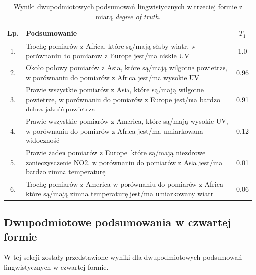 \documentclass{article}
\begin{document}
\begin{table}[H]
\begin{center}
\normalsize %
\begin{tabular}{|c|p{10cm}|c|} %
\hline
\textbf{Lp.} & \textbf{Podsumowanie} & \textbf{\(T_1\)} \\ \hline
1. & Trochę pomiarów z Africa, które są/mają słaby wiatr, w porównaniu do pomiarów z Europe jest/ma niskie UV & 1.0 \\\hline
2. & Około połowy pomiarów z Asia, które są/mają wilgotne powietrze, w porównaniu do pomiarów z Africa jest/ma wysokie UV & 0.96 \\\hline
3. & Prawie wszystkie pomiarów z Asia, które są/mają wilgotne powietrze, w porównaniu do pomiarów z Europe jest/ma bardzo dobra jakość powietrza & 0.91 \\\hline
4. & Prawie wszystkie pomiarów z America, które są/mają wysokie UV, w porównaniu do pomiarów z Africa jest/ma umiarkowana widoczność & 0.12 \\ \hline
5. & Prawie żaden pomiarów z Europe, które są/mają niezdrowe zanieczysczenie NO2, w porównaniu do pomiarów z Asia jest/ma bardzo zimna temperaturę & 0.01 \\ \hline
6. & Trochę pomiarów z America w porównaniu do pomiarów z Africa, które są/mają zimna temperaturę jest/ma umiarkowany wiatr & 0.06 \\ \hline
\end{tabular}
\caption{Wyniki dwupodmiotowych podsumowań lingwistycznych w trzeciej formie z miarą \textit{degree of truth}.}
\end{center}
\end{table}

\subsection{Dwupodmiotowe podsumowania w czwartej formie}
W tej sekcji zostały przedstawione wyniki dla dwupodmiotowych podsumowań lingwistycznych w czwartej formie.
\end{document}
